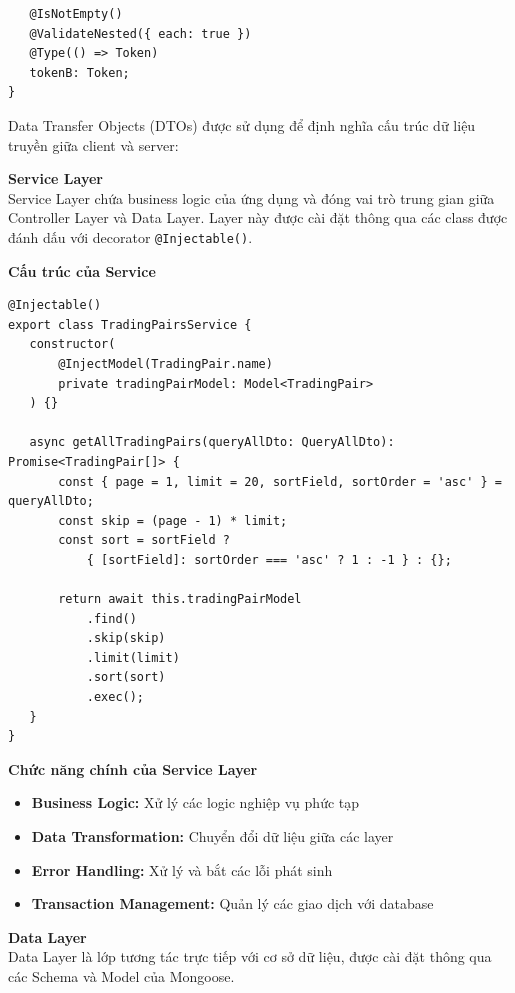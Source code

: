 \begin{description}
\begin{lstlisting}
   @IsNotEmpty()
   @ValidateNested({ each: true }) 
   @Type(() => Token)  
   tokenB: Token;
}
\end{lstlisting}
Data Transfer Objects (DTOs) được sử dụng để định nghĩa cấu trúc dữ liệu truyền
giữa client và server:

    \item \textbf{Service Layer} \\
          Service Layer chứa business logic của ứng dụng và đóng vai trò trung gian giữa
          Controller Layer và Data Layer. Layer này được cài đặt thông qua các class được
          đánh dấu với decorator \texttt{@Injectable()}.

          \textbf{Cấu trúc của Service}
          \begin{lstlisting}
@Injectable()
export class TradingPairsService {
   constructor(
       @InjectModel(TradingPair.name) 
       private tradingPairModel: Model<TradingPair>
   ) {}

   async getAllTradingPairs(queryAllDto: QueryAllDto): Promise<TradingPair[]> {
       const { page = 1, limit = 20, sortField, sortOrder = 'asc' } = queryAllDto;
       const skip = (page - 1) * limit;
       const sort = sortField ? 
           { [sortField]: sortOrder === 'asc' ? 1 : -1 } : {};

       return await this.tradingPairModel
           .find()
           .skip(skip)
           .limit(limit)
           .sort(sort)
           .exec();
   }
}
\end{lstlisting}

          \textbf{Chức năng chính của Service Layer}
          \begin{itemize}
              \item \textbf{Business Logic:} Xử lý các logic nghiệp vụ phức tạp
              \item \textbf{Data Transformation:} Chuyển đổi dữ liệu giữa các layer
              \item \textbf{Error Handling:} Xử lý và bắt các lỗi phát sinh
              \item \textbf{Transaction Management:} Quản lý các giao dịch với database
          \end{itemize}
\clearpage

    \item \textbf{Data Layer} \\
          Data Layer là lớp tương tác trực tiếp với cơ sở dữ liệu, được cài đặt thông qua
          các Schema và Model của Mongoose.


\end{description}
